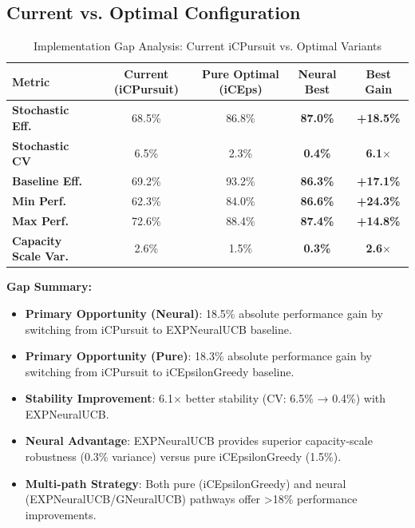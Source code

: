 \documentclass[12pt,a4paper]{article}
\newcommand{\success}[1]{\textcolor{accentgreen}{\textbf{#1}}}
\newcommand{\warning}[1]{\textcolor{warningred}{\textbf{#1}}}
\newcommand{\legacy}[1]{\textcolor{legacycolor}{\textbf{#1}}}
\newcommand{\neural}[1]{\textcolor{neuralcolor}{\textbf{#1}}}
\begin{document}
\subsection{Current vs. Optimal Configuration}

\begin{table}[H]
\centering
\caption{Implementation Gap Analysis: Current iCPursuit vs. Optimal Variants}
\label{tab:implementation-gap}
\begin{tabular}{@{}lcccc@{}}
\toprule
\textbf{Metric} & \textbf{Current (iCPursuit)} & \textbf{Pure Optimal (iCEps)} & \textbf{Neural Best} & \textbf{Best Gain} \\
\midrule
\warning{Stochastic Eff.} & 68.5\% & 86.8\% & \legacy{87.0\%} & \legacy{+18.5\%} \\
\warning{Stochastic CV} & 6.5\% & 2.3\% & \legacy{0.4\%} & \legacy{6.1$\times$} \\
\warning{Baseline Eff.} & 69.2\% & 93.2\% & \legacy{86.3\%} & \legacy{+17.1\%} \\
\warning{Min Perf.} & 62.3\% & 84.0\% & \legacy{86.6\%} & \legacy{+24.3\%} \\
\warning{Max Perf.} & 72.6\% & 88.4\% & \legacy{87.4\%} & \legacy{+14.8\%} \\
\midrule
\warning{Capacity Scale Var.} & 2.6\% & 1.5\% & \legacy{0.3\%} & \legacy{2.6$\times$} \\
\bottomrule
\end{tabular}
\end{table}

\textbf{Gap Summary:}
\begin{itemize}
\item \warning{Primary Opportunity (Neural)}: 18.5\% absolute performance gain by switching from iCPursuit to EXPNeuralUCB baseline.
\item \warning{Primary Opportunity (Pure)}: 18.3\% absolute performance gain by switching from iCPursuit to iCEpsilonGreedy baseline.
\item \warning{Stability Improvement}: 6.1$\times$ better stability (CV: 6.5\% → 0.4\%) with EXPNeuralUCB.
\item \neural{Neural Advantage}: EXPNeuralUCB provides superior capacity-scale robustness (0.3\% variance) versus pure iCEpsilonGreedy (1.5\%).
\item \success{Multi-path Strategy}: Both pure (iCEpsilonGreedy) and neural (EXPNeuralUCB/GNeuralUCB) pathways offer >18\% performance improvements.
\end{itemize}
\end{document}

